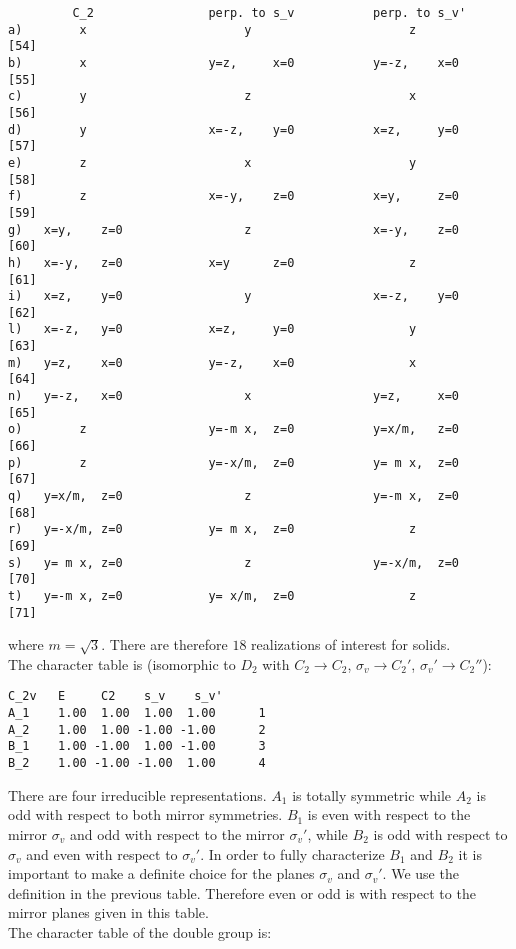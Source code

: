 \documentclass[12pt,a4paper,twoside]{report}
\begin{document}
\begin{tcolorbox}
\begin{footnotesize}
\begin{verbatim}
         C_2                perp. to s_v           perp. to s_v'
a)        x                      y                      z          [54]
b)        x                 y=z,     x=0           y=-z,    x=0    [55]
c)        y                      z                      x          [56]
d)        y                 x=-z,    y=0           x=z,     y=0    [57]
e)        z                      x                      y          [58]    
f)        z                 x=-y,    z=0           x=y,     z=0    [59]
g)   x=y,    z=0                 z                 x=-y,    z=0    [60]
h)   x=-y,   z=0            x=y      z=0                z          [61] 
i)   x=z,    y=0                 y                 x=-z,    y=0    [62] 
l)   x=-z,   y=0            x=z,     y=0                y          [63]
m)   y=z,    x=0            y=-z,    x=0                x          [64]
n)   y=-z,   x=0                 x                 y=z,     x=0    [65]
o)        z                 y=-m x,  z=0           y=x/m,   z=0    [66] 
p)        z                 y=-x/m,  z=0           y= m x,  z=0    [67] 
q)   y=x/m,  z=0                 z                 y=-m x,  z=0    [68]
r)   y=-x/m, z=0            y= m x,  z=0                z          [69]
s)   y= m x, z=0                 z                 y=-x/m,  z=0    [70]
t)   y=-m x, z=0            y= x/m,  z=0                z          [71]
\end{verbatim}
\end{footnotesize}
\end{tcolorbox}

where $m=\sqrt{3}$.
There are therefore $18$ realizations of interest for solids. \\
The character table is (isomorphic to $D_2$ with $C_2 \rightarrow C_2$,
$\sigma_v \rightarrow C_2'$, $\sigma_v' \rightarrow C_2''$):
\begin{tcolorbox}
\begin{footnotesize}
\begin{verbatim}
C_2v   E     C2    s_v    s_v'
A_1    1.00  1.00  1.00  1.00      1
A_2    1.00  1.00 -1.00 -1.00      2
B_1    1.00 -1.00  1.00 -1.00      3
B_2    1.00 -1.00 -1.00  1.00      4
\end{verbatim}
\end{footnotesize}
\end{tcolorbox}

There are four irreducible representations. $A_1$ is totally symmetric while
$A_2$ is odd with respect to both mirror symmetries.  
$B_1$ is even with respect to the mirror $\sigma_v$ and odd with respect to
the mirror $\sigma_v'$, while $B_2$ is odd with respect to $\sigma_v$ and even 
with respect to $\sigma_v'$. In order to fully characterize $B_1$ and $B_2$
it is important to make a definite choice for the planes $\sigma_v$ and $\sigma_v'$.
We use the definition in the previous table. Therefore even or odd is with respect
to the mirror planes given in this table. \\
The character table of the double group is:
\end{document}
